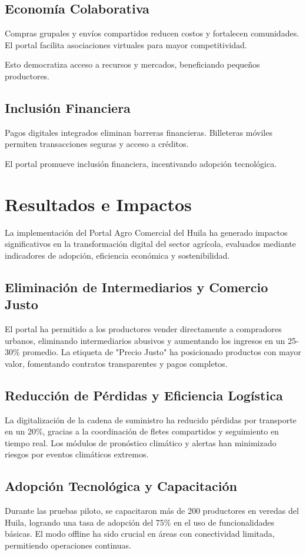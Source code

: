 \subsection{Economía Colaborativa}
Compras grupales y envíos compartidos reducen costos y fortalecen comunidades. El portal facilita asociaciones virtuales para mayor competitividad.

Esto democratiza acceso a recursos y mercados, beneficiando pequeños productores.

\subsection{Inclusión Financiera}
Pagos digitales integrados eliminan barreras financieras. Billeteras móviles permiten transacciones seguras y acceso a créditos.

El portal promueve inclusión financiera, incentivando adopción tecnológica.

\section{Resultados e Impactos}
La implementación del Portal Agro Comercial del Huila ha generado impactos significativos en la transformación digital del sector agrícola, evaluados mediante indicadores de adopción, eficiencia económica y sostenibilidad.

\subsection{Eliminación de Intermediarios y Comercio Justo}
El portal ha permitido a los productores vender directamente a compradores urbanos, eliminando intermediarios abusivos y aumentando los ingresos en un 25-30\% promedio. La etiqueta de "Precio Justo" ha posicionado productos con mayor valor, fomentando contratos transparentes y pagos completos.

\subsection{Reducción de Pérdidas y Eficiencia Logística}
La digitalización de la cadena de suministro ha reducido pérdidas por transporte en un 20\%, gracias a la coordinación de fletes compartidos y seguimiento en tiempo real. Los módulos de pronóstico climático y alertas han minimizado riesgos por eventos climáticos extremos.

\subsection{Adopción Tecnológica y Capacitación}
Durante las pruebas piloto, se capacitaron más de 200 productores en veredas del Huila, logrando una tasa de adopción del 75\% en el uso de funcionalidades básicas. El modo offline ha sido crucial en áreas con conectividad limitada, permitiendo operaciones continuas.

